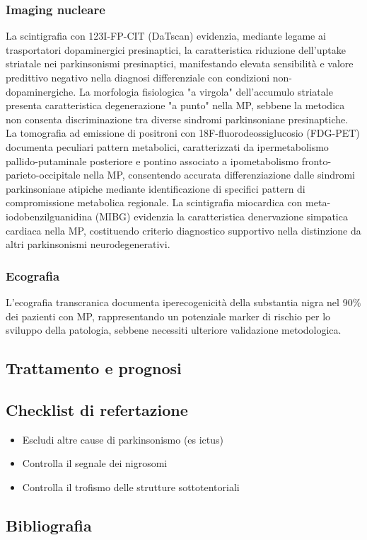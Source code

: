 \subsubsection{Imaging nucleare}
La scintigrafia con 123I-FP-CIT (DaTscan) evidenzia, mediante legame ai trasportatori dopaminergici presinaptici, la caratteristica riduzione dell'uptake striatale nei parkinsonismi presinaptici, manifestando elevata sensibilità e valore predittivo negativo nella diagnosi differenziale con condizioni non-dopaminergiche. La morfologia fisiologica "a virgola" dell'accumulo striatale presenta caratteristica degenerazione "a punto" nella MP, sebbene la metodica non consenta discriminazione tra diverse sindromi parkinsoniane presinaptiche.
La tomografia ad emissione di positroni con 18F-fluorodeossiglucosio (FDG-PET) documenta peculiari pattern metabolici, caratterizzati da ipermetabolismo pallido-putaminale posteriore e pontino associato a ipometabolismo fronto-parieto-occipitale nella MP, consentendo accurata differenziazione dalle sindromi parkinsoniane atipiche mediante identificazione di specifici pattern di compromissione metabolica regionale.
La scintigrafia miocardica con meta-iodobenzilguanidina (MIBG) evidenzia la caratteristica denervazione simpatica cardiaca nella MP, costituendo criterio diagnostico supportivo nella distinzione da altri parkinsonismi neurodegenerativi.

\subsubsection{Ecografia}
L'ecografia transcranica documenta iperecogenicità della substantia nigra nel 90\% dei pazienti con MP, rappresentando un potenziale marker di rischio per lo sviluppo della patologia, sebbene necessiti ulteriore validazione metodologica.

\subsection{Trattamento e prognosi}

\subsection{Checklist di refertazione}

\begin{itemize}[label=$\square$] %
	\item Escludi altre cause di parkinsonismo (es ictus)
	\item Controlla il segnale dei nigrosomi
	\item Controlla il trofismo delle strutture sottotentoriali
\end{itemize}

\subsection{Bibliografia}
\small{
	
	
}

